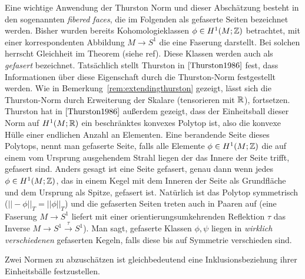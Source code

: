     \begin{bsp}
    \label{ex:fiberedfaces}
        Eine wichtige Anwendung der Thurston Norm und dieser Abschätzung besteht in den sogenannten \textit{fibered faces}, die im Folgenden als gefaserte Seiten bezeichnet werden. Bisher wurden bereits Kohomologieklassen $\phi \in H^1(M;\mathbb{Z})$ betrachtet, mit einer korrespondenten Abbildung $M \to S^1$ die eine Faserung darstellt. Bei solchen herrscht Gleichheit im Theorem (siehe ref). Diese Klassen werden auch als \textit{gefasert} bezeichnet. Tatsächlich stellt Thurston in $\cite{Thurston1986}$ fest, dass Informationen über diese Eigenschaft durch die Thurston-Norm festgestellt werden. Wie in Bemerkung~\ref{rem:extendingthurston} gezeigt, lässt sich die Thurston-Norm durch Erweiterung der Skalare (tensorieren mit $\mathbb{R}$), fortsetzen. Thurston hat in $\cite{Thurston1986}$ außerdem gezeigt, dass der Einheitsball dieser Norm auf $H^1(M;\mathbb{R})$ ein beschränktes konvexes Polytop ist, also die konvexe Hülle einer endlichen Anzahl an Elementen. Eine berandende Seite dieses Polytops, nennt man gefaserte Seite, falls alle Elemente $\phi \in H^1(M;\mathbb{Z})$ die auf einem vom Ursprung ausgehendem Strahl liegen der das Innere der Seite trifft, gefasert sind. Anders gesagt ist eine Seite gefasert, genau dann wenn jedes $\phi \in H^1(M;\mathbb{Z})$, das in einem Kegel mit dem Inneren der Seite als Grundfläche und dem Ursprung als Spitze, gefasert ist. Natürlich ist das Polytop symmetrisch ($||-\phi||_T=||\phi||_T$) und die gefaserten Seiten treten auch in Paaren auf (eine Faserung $M \to S^1$ liefert mit einer orientierungsumkehrenden Reflektion $\tau$ das Inverse $M \to S^1 \stackrel \tau \to S^1$). Man sagt, gefaserte Klassen $\phi,\psi$ liegen in \textit{wirklich verschiedenen} gefaserten Kegeln, falls diese bis auf Symmetrie verschieden sind. 
    \end{bsp}

    \begin{bem}
        Zwei Normen zu abzuschätzen ist gleichbedeutend eine Inklusionsbeziehung ihrer Einheitsbälle festzustellen.
    \end{bem}

